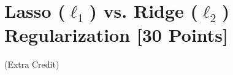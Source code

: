 \newpage
\problem[4]

\begin{solution}

\end{solution}

\newpage
\problem[16]

\begin{solution}


  
\end{solution}

\newpage
\problem[4]

\begin{solution}

\end{solution}

\newpage
\problem[4]

\begin{solution}

\end{solution}

\newpage
\problem[4]

\begin{solution}

\end{solution}

\newpage
\problem[4]

\begin{solution}

\end{solution}



\newpage
\section{Lasso (\texorpdfstring{$\ell_1$}{L1}) vs. Ridge (\texorpdfstring{$\ell_2$}{L2}) Regularization [30 Points]}

\problem[12]


\begin{solution}


\end{solution}


\newpage
\problem[9]

\begin{solution}

\end{solution}


\newpage
\problem[9] (Extra Credit)


\begin{solution}

\end{solution}





